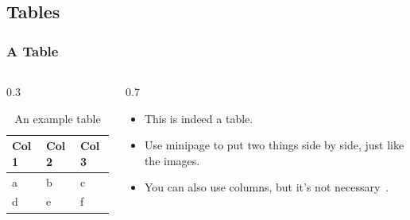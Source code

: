 \documentclass[
	10pt, %
	aspectratio=169, %
]{beamer}
\begin{document}
\subsection{Tables}
\begin{frame}
	\frametitle{A Table}
	\centering

	\begin{columns}[T]
		\begin{column}{0.3\textwidth}
			\begin{table}
				\centering
				{\small
					\begin{tabular}[c]{lll}
						\toprule
						\textbf{Col 1} & \textbf{Col 2} & \textbf{Col 3} \\ \midrule
						a              & b              & c              \\
						d              & e              & f              \\
						\bottomrule
					\end{tabular}
				}
				\caption{An example table}
				\label{tab:}
			\end{table}
		\end{column}
		\begin{column}{0.7\textwidth}
			\par
			\begin{itemize}
				\item This is indeed a table.
				\item Use minipage to put two things side by side, just like the images.
				\item You can also use columns, but it's not necessary~\cite{scharrerAnswerMinipageColumns2011}.
			\end{itemize}
		\end{column}
	\end{columns}
\end{frame}
\end{document}

